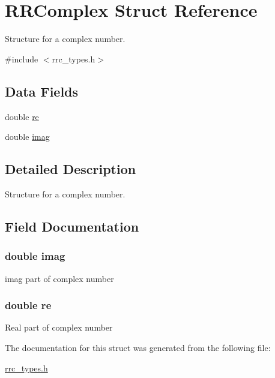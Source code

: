 \hypertarget{struct_r_r_complex}{\section{R\-R\-Complex Struct Reference}
\label{struct_r_r_complex}
}


Structure for a complex number.  




{\ttfamily \#include $<$rrc\-\_\-types.\-h$>$}

\subsection*{Data Fields}
\begin{DoxyCompactItemize}
\item 
double \hyperlink{struct_r_r_complex_a5a6fce2fc5cae153945fea2c45beeb4f}{re}
\item 
double \hyperlink{struct_r_r_complex_a9aace20780eedccdde9fe2352ee4fb05}{imag}
\end{DoxyCompactItemize}


\subsection{Detailed Description}
Structure for a complex number. 

\subsection{Field Documentation}
\hypertarget{struct_r_r_complex_a9aace20780eedccdde9fe2352ee4fb05}{
\subsubsection[{imag}]{\setlength{\rightskip}{0pt plus 5cm}double imag}}\label{struct_r_r_complex_a9aace20780eedccdde9fe2352ee4fb05}
imag part of complex number \hypertarget{struct_r_r_complex_a5a6fce2fc5cae153945fea2c45beeb4f}{
\subsubsection[{re}]{\setlength{\rightskip}{0pt plus 5cm}double re}}\label{struct_r_r_complex_a5a6fce2fc5cae153945fea2c45beeb4f}
Real part of complex number 

The documentation for this struct was generated from the following file\-:\begin{DoxyCompactItemize}
\item 
\hyperlink{rrc__types_8h}{rrc\-\_\-types.\-h}\end{DoxyCompactItemize}
